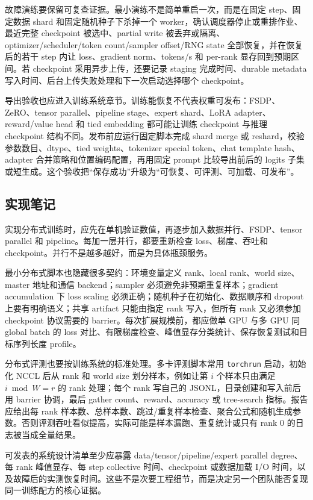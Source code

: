 \documentclass[UTF8,zihao=-4,openany]{ctexbook}
\begin{document}
故障演练要保留可复查证据。最小演练不是简单重启一次，而是在固定 step、固定数据 shard 和固定随机种子下杀掉一个 worker，确认调度器停止或重排作业、最近完整 checkpoint 被选中、partial write 被丢弃或隔离、optimizer/scheduler/token count/sampler offset/RNG state 全部恢复，并在恢复后的若干 step 内让 loss、gradient norm、tokens/s 和 per-rank 显存回到预期区间。若 checkpoint 采用异步上传，还要记录 staging 完成时间、durable metadata 写入时间、后台上传失败处理和下一次启动选择哪个 checkpoint。

导出验收也应进入训练系统章节。训练能恢复不代表权重可发布：FSDP、ZeRO、tensor parallel、pipeline stage、expert shard、LoRA adapter、reward/value head 和 tied embedding 都可能让训练 checkpoint 与推理 checkpoint 结构不同。发布前应运行固定脚本完成 shard merge 或 reshard，校验参数数目、dtype、tied weights、tokenizer special token、chat template hash、adapter 合并策略和位置编码配置，再用固定 prompt 比较导出前后的 logits 子集或短生成。这个验收把“保存成功”升级为“可恢复、可评测、可加载、可发布”。

\subsection{实现笔记}
实现分布式训练时，应先在单机验证数值，再逐步加入数据并行、FSDP、tensor parallel 和 pipeline。每加一层并行，都要重新检查 loss、梯度、吞吐和 checkpoint。并行不是越多越好，而是为具体瓶颈服务。

最小分布式脚本也隐藏很多契约：环境变量定义 rank、local rank、world size、master 地址和通信 backend；sampler 必须避免非预期重复样本；gradient accumulation 下 loss scaling 必须正确；随机种子在初始化、数据顺序和 dropout 上要有明确语义；共享 artifact 只能由指定 rank 写入，但所有 rank 又必须参加 checkpoint 协议需要的 barrier。每次扩展规模前，都应做单 GPU 与多 GPU 同 global batch 的 loss 对比、有限梯度检查、峰值显存分类统计、保存恢复测试和目标序列长度 profile。

分布式评测也要按训练系统的标准处理。多卡评测脚本常用 \texttt{torchrun} 启动，初始化 NCCL 后从 rank 和 world size 划分样本，例如让第 $i$ 个样本只由满足 $i \bmod W=r$ 的 rank 处理；每个 rank 写自己的 JSONL，目录创建和写入前后用 barrier 协调，最后 gather count、reward、accuracy 或 tree-search 指标。报告应给出每 rank 样本数、总样本数、跳过/重复样本检查、聚合公式和随机生成参数。否则评测吞吐看似提高，实际可能是样本漏跑、重复统计或只有 rank 0 的日志被当成全量结果。

可发表的系统设计清单至少应暴露 data/tensor/pipeline/expert parallel degree、每 rank 峰值显存、每 step collective 时间、checkpoint 或数据加载 I/O 时间，以及故障后的实测恢复时间。这些不是次要工程细节，而是决定另一个团队能否复现同一训练配方的核心证据。
\end{document}
